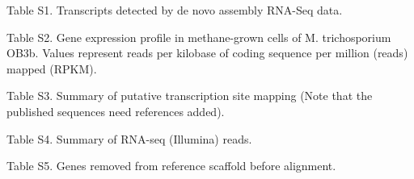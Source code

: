 Table S1. Transcripts detected by de novo assembly RNA-Seq data.

Table S2. Gene expression profile in methane-grown cells of M. trichosporium OB3b. Values represent reads per kilobase of coding sequence per million (reads) mapped (RPKM).

Table S3. Summary of putative transcription site mapping (Note that the published sequences need references added).

Table S4. Summary of RNA-seq (Illumina) reads.

Table S5. Genes removed from reference scaffold before alignment.



